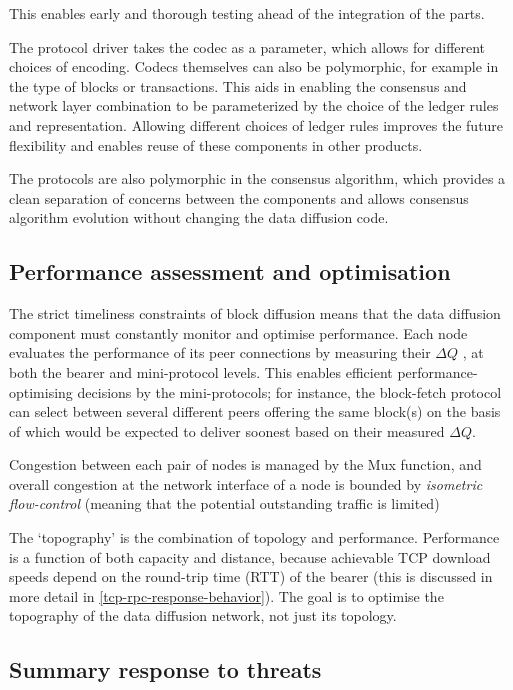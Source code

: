 \documentclass[11pt,a4paper]{article}
\begin{document}
This enables early and thorough testing ahead of the integration of the
parts.

The protocol driver takes the codec as a parameter, which allows for
different choices of encoding. Codecs themselves can also be
polymorphic, for example in the type of blocks or transactions. This
aids in enabling the consensus and network layer combination to be
parameterized by the choice of the ledger rules and representation.
Allowing different choices of ledger rules improves the future
flexibility and enables reuse of these components in other products.

The protocols are also polymorphic in the consensus algorithm, which
provides a clean separation of concerns between the components and
allows consensus algorithm evolution without changing the data diffusion
code.

\subsection{Performance assessment and optimisation}
\label{performance-assessment-and-optimisation}

The strict timeliness constraints of block diffusion means that the data
diffusion component must constantly monitor and optimise performance.
Each node evaluates the performance of its peer connections by measuring
their $\Delta{}Q$ \cite{Comp20}, at both the bearer and mini-protocol levels. This
enables efficient performance-optimising decisions by the
mini-protocols; for instance, the block-fetch protocol can select
between several different peers offering the same block(s) on the basis
of which would be expected to deliver soonest based on their measured
$\Delta{}Q$.

Congestion between each pair of nodes is managed by the Mux function,
and overall congestion at the network interface of a node is bounded by
\emph{isometric flow-control} (meaning that the potential outstanding
traffic is limited)

The `topography' is the combination of topology and performance.
Performance is a function of both capacity and distance, because
achievable TCP download speeds depend on the round-trip time (RTT) of
the bearer (this is discussed in more detail in \cref{tcp-rpc-response-behavior}).
The goal is to optimise the topography of the data diffusion network,
not just its topology.

\subsection{Summary response to threats}
\label{summary-response-to-threats}
\end{document}

